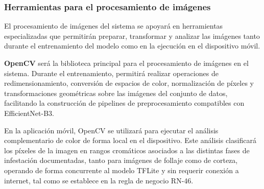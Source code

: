 \newpage
\subsubsection{Herramientas para el procesamiento de imágenes}

El procesamiento de imágenes del sistema se apoyará en herramientas
especializadas que permitirán preparar, transformar y analizar las
imágenes tanto durante el entrenamiento del modelo como en la
ejecución en el dispositivo móvil.

\textbf{OpenCV} será la biblioteca principal para el procesamiento
de imágenes en el sistema. Durante el entrenamiento, permitirá realizar
operaciones de redimensionamiento, conversión de espacios de color,
normalización de píxeles y transformaciones geométricas sobre las
imágenes del conjunto de datos, facilitando la construcción de pipelines de preprocesamiento compatibles con EfficientNet-B3.

En la aplicación móvil, OpenCV se utilizará para ejecutar el análisis
complementario de color de forma local en el dispositivo. Este análisis
clasificará los píxeles de la imagen en rangos cromáticos asociados
a las distintas fases de infestación documentadas, tanto para imágenes
de follaje como de corteza, operando de forma concurrente al modelo
TFLite y sin requerir conexión a internet, tal como se establece en
la regla de negocio RN-46.